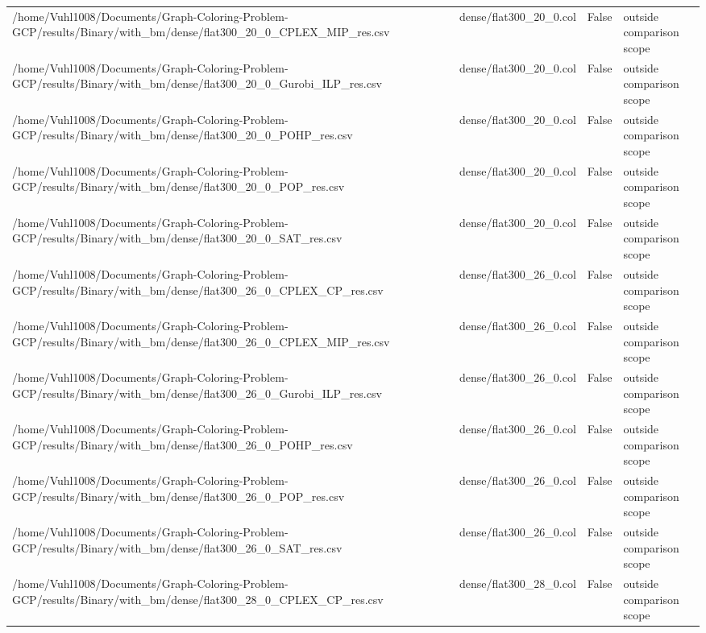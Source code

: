 \begin{table}[htbp]
\begin{tabular}{llll}
/home/Vuhl1008/Documents/Graph-Coloring-Problem-GCP/results/Binary/with\_bm/dense/flat300\_20\_0\_CPLEX\_MIP\_res.csv & dense/flat300\_20\_0.col & False & outside comparison scope \\
/home/Vuhl1008/Documents/Graph-Coloring-Problem-GCP/results/Binary/with\_bm/dense/flat300\_20\_0\_Gurobi\_ILP\_res.csv & dense/flat300\_20\_0.col & False & outside comparison scope \\
/home/Vuhl1008/Documents/Graph-Coloring-Problem-GCP/results/Binary/with\_bm/dense/flat300\_20\_0\_POHP\_res.csv & dense/flat300\_20\_0.col & False & outside comparison scope \\
/home/Vuhl1008/Documents/Graph-Coloring-Problem-GCP/results/Binary/with\_bm/dense/flat300\_20\_0\_POP\_res.csv & dense/flat300\_20\_0.col & False & outside comparison scope \\
/home/Vuhl1008/Documents/Graph-Coloring-Problem-GCP/results/Binary/with\_bm/dense/flat300\_20\_0\_SAT\_res.csv & dense/flat300\_20\_0.col & False & outside comparison scope \\
/home/Vuhl1008/Documents/Graph-Coloring-Problem-GCP/results/Binary/with\_bm/dense/flat300\_26\_0\_CPLEX\_CP\_res.csv & dense/flat300\_26\_0.col & False & outside comparison scope \\
/home/Vuhl1008/Documents/Graph-Coloring-Problem-GCP/results/Binary/with\_bm/dense/flat300\_26\_0\_CPLEX\_MIP\_res.csv & dense/flat300\_26\_0.col & False & outside comparison scope \\
/home/Vuhl1008/Documents/Graph-Coloring-Problem-GCP/results/Binary/with\_bm/dense/flat300\_26\_0\_Gurobi\_ILP\_res.csv & dense/flat300\_26\_0.col & False & outside comparison scope \\
/home/Vuhl1008/Documents/Graph-Coloring-Problem-GCP/results/Binary/with\_bm/dense/flat300\_26\_0\_POHP\_res.csv & dense/flat300\_26\_0.col & False & outside comparison scope \\
/home/Vuhl1008/Documents/Graph-Coloring-Problem-GCP/results/Binary/with\_bm/dense/flat300\_26\_0\_POP\_res.csv & dense/flat300\_26\_0.col & False & outside comparison scope \\
/home/Vuhl1008/Documents/Graph-Coloring-Problem-GCP/results/Binary/with\_bm/dense/flat300\_26\_0\_SAT\_res.csv & dense/flat300\_26\_0.col & False & outside comparison scope \\
/home/Vuhl1008/Documents/Graph-Coloring-Problem-GCP/results/Binary/with\_bm/dense/flat300\_28\_0\_CPLEX\_CP\_res.csv & dense/flat300\_28\_0.col & False & outside comparison scope \\

\end{tabular}
\end{table}
